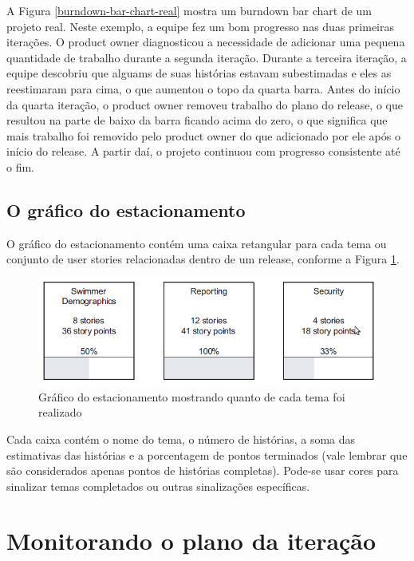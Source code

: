 \documentclass[a4paper,abntfigtabnum,noindentfirst]{abnt}
\begin{document}
A Figura \ref{burndown-bar-chart-real} mostra um burndown bar chart de um projeto real. Neste exemplo, a equipe fez um bom progresso nas duas primeiras iterações. O product owner diagnosticou a necessidade de adicionar uma pequena quantidade de trabalho durante a segunda iteração. Durante a terceira iteração, a equipe descobriu que alguams de suas histórias estavam subestimadas e eles as reestimaram para cima, o que aumentou o topo da quarta barra. Antes do início da quarta iteração, o product owner removeu trabalho do plano do release, o que resultou na parte de baixo da barra ficando acima do zero, o que significa que mais trabalho foi removido pelo product owner do que adicionado por ele após o início do release. A partir daí, o projeto continuou com progresso consistente até o fim.


\section{O gráfico do estacionamento}

O gráfico do estacionamento contém uma caixa retangular para cada tema ou conjunto de user stories relacionadas dentro de um release, conforme a Figura \ref{grafico-do-estacionamento}.

\begin{figure}
  \caption{Gráfico do estacionamento mostrando quanto de cada tema foi realizado}
  \label{grafico-do-estacionamento}
  \begin{center}
  \includegraphics[scale=0.6]{grafico-do-estacionamento}
  \end{center}
\end{figure}

Cada caixa contém o nome do tema, o número de histórias, a soma das estimativas das histórias e a porcentagem de pontos terminados (vale lembrar que são considerados apenas pontos de histórias completas). Pode-se usar cores para sinalizar temas completados ou outras sinalizações específicas.


\chapter{Monitorando o plano da iteração}
\end{document}
